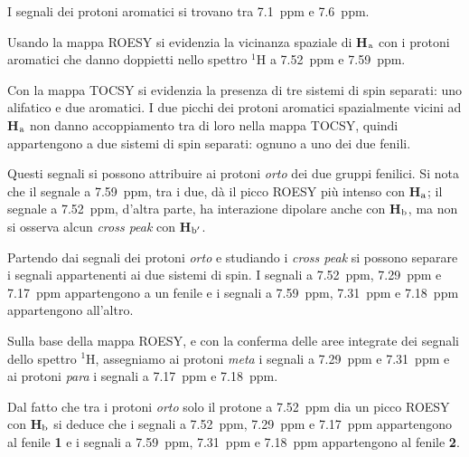 \documentclass[a4paper, italian, oneside, 12pt]{article}
\begin{document}
I segnali dei protoni aromatici si trovano tra 7.1~ppm e 7.6~ppm.

Usando la mappa ROESY si evidenzia la vicinanza spaziale di {\bf{H$_{\textrm a}$}} con i protoni aromatici che danno doppietti nello spettro $^1$H a 7.52~ppm e 7.59~ppm. 

Con la mappa TOCSY si evidenzia la presenza di tre sistemi di spin separati: uno alifatico e due aromatici. I due picchi dei protoni aromatici spazialmente vicini ad {\bf{H$_{\textrm a}$}} non danno accoppiamento tra di loro nella mappa TOCSY, quindi appartengono a due sistemi di spin separati: ognuno a uno dei due fenili.

Questi segnali si possono attribuire ai protoni \emph{orto} dei due gruppi fenilici. Si nota che il segnale a 7.59~ppm, tra i due, dà il picco ROESY più intenso con {\bf{H$_{\textrm a}$}}; il segnale a 7.52~ppm, d'altra parte, ha interazione dipolare anche con {\bf{H$_{\textrm b}$}}, ma non si osserva alcun {\emph{cross peak}} con {\bf{H$_{\textrm b'}$}}.

Partendo dai segnali dei protoni \emph{orto} e studiando i {\emph{cross peak}} si possono separare i segnali appartenenti ai due sistemi di spin. I segnali a 7.52~ppm, 7.29~ppm e 7.17~ppm appartengono a un fenile e i segnali a 7.59~ppm, 7.31~ppm e 7.18~ppm appartengono all'altro.

Sulla base della mappa ROESY, e con la conferma delle aree integrate dei segnali dello spettro $^1$H, assegniamo ai protoni \emph{meta} i segnali a 7.29~ppm e 7.31~ppm e ai protoni \emph{para} i segnali a 7.17~ppm e 7.18~ppm.

Dal fatto che tra i protoni \emph{orto} solo il protone a 7.52~ppm dia un picco ROESY con {\bf{H$_{\textrm b}$}} si deduce che i segnali a 7.52~ppm, 7.29~ppm e 7.17~ppm appartengono al fenile {\bf{1}} e i segnali a 7.59~ppm, 7.31~ppm e 7.18~ppm appartengono al fenile {\bf{2}}.
\end{document}
